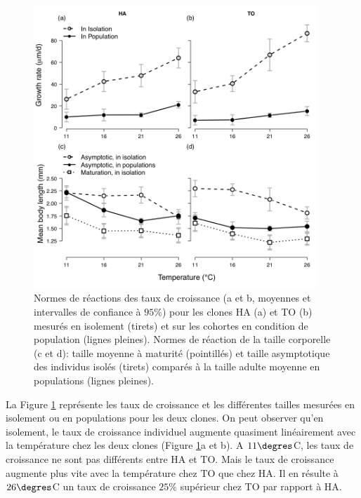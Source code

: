 \begin{figure}[!ht]
\begin{center}
\includegraphics[width=0.95\textwidth]{1_CorpsDeThese/Resumes/Fig/FIP03}
\caption[Normes de réactions des taux
de croissance et tailles moyennes]{Normes de réactions des taux de croissance (a
et b, moyennes et intervalles de confiance à $95\%$) pour les clones HA (a) et TO (b) mesurés en isolement (tirets) et sur les cohortes en condition de population (lignes pleines). Normes
de réaction de la taille corporelle (c et d): taille moyenne à maturité
(pointillés) et taille asymptotique des individus isolés (tirets) comparés à la
taille adulte moyenne en populations (lignes pleines).}
\label{fig:FIP3}
\end{center}
\end{figure}

La Figure \ref{fig:FIP3} représente les taux de croissance et les différentes
tailles mesurées en isolement ou en populations pour les deux clones. On peut
observer qu'en isolement, le taux de croissance individuel augmente quasiment
linéairement avec la température chez les deux clones (Figure \ref{fig:FIP3}a
et b). A $11\degres$C, les taux de croissance ne sont pas différents entre HA et
TO. Mais le taux de croissance augmente plus vite avec
la température chez TO que chez HA. Il en résulte à
$26\degres$C un taux de croissance $25\%$ supérieur chez TO par rapport à HA. 

